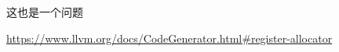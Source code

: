 
\begin{frame}{}

  \pause
  \vspace{0.30cm}
  \begin{center}
    这也是一个问题
  \end{center}

	\pause
	\vspace{0.50cm}
	\begin{center}
	\end{center}
\end{frame}

\begin{frame}{}
  \begin{center}

    {\footnotesize \url{https://www.llvm.org/docs/CodeGenerator.html\#register-allocator}}
  \end{center}
\end{frame}

\begin{frame}{}
  \begin{columns}
      \pause
  \end{columns}
\end{frame}
